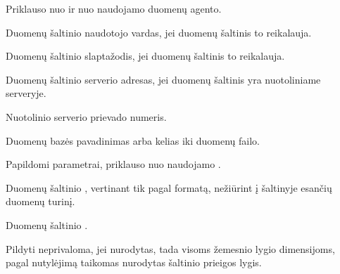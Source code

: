 \documentclass[letterpaper,10pt,lithuanian]{sphinxmanual}
\begin{document}
\begin{fulllineitems}
\begin{description}
\sphinxAtStartPar
Priklauso nuo  ir nuo naudojamo duomenų agento.

\sphinxAtStartPar
Duomenų šaltinio naudotojo vardas, jei duomenų šaltinis to reikalauja.

\sphinxAtStartPar
Duomenų šaltinio slaptažodis, jei duomenų šaltinis to reikalauja.

\sphinxAtStartPar
Duomenų šaltinio serverio adresas, jei duomenų šaltinis yra
nuotoliniame serveryje.

\sphinxAtStartPar
Nuotolinio serverio prievado numeris.

\sphinxAtStartPar
Duomenų bazės pavadinimas arba kelias iki duomenų failo.

\sphinxAtStartPar
Papildomi parametrai, priklauso nuo naudojamo .

\end{description}

\end{fulllineitems}


\begin{fulllineitems}
\label{\detokenize{dimensijos:resource.level}}
\pysigstartsignatures
\pysigline
{}
\pysigstopsignatures
\sphinxAtStartPar
Duomenų šaltinio {\hyperref[\detokenize{branda:level}]{}}, vertinant tik pagal formatą,
nežiūrint į šaltinyje esančių duomenų turinį.

\end{fulllineitems}


\begin{fulllineitems}
\label{\detokenize{dimensijos:resource.access}}
\pysigstartsignatures
\pysigline
{}
\pysigstopsignatures
\sphinxAtStartPar
Duomenų šaltinio {\hyperref[\detokenize{prieiga:access}]{}}.

\sphinxAtStartPar
Pildyti neprivaloma, jei nurodytas, tada visoms žemesnio lygio dimensijoms,
pagal nutylėjimą taikomas nurodytas šaltinio prieigos lygis.

\end{fulllineitems}
\end{document}
